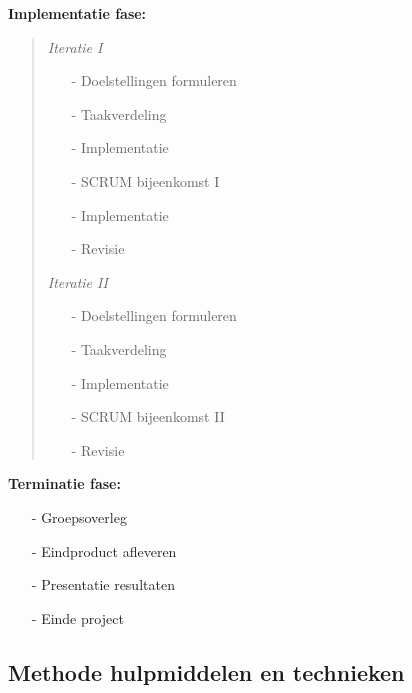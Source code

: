 \documentclass{article}
\begin{document}
\textbf{Implementatie fase:}
\begin{quotation}
	

\textit{Iteratie I}
\begin{itemize}
\item[-] Doelstellingen formuleren\\[-5mm]
\item[-] Taakverdeling\\[-5mm]
\item[-] Implementatie\\[-5mm]
\item[-] SCRUM bijeenkomst I\\[-5mm]
\item[-] Implementatie\\[-5mm]
\item[-] Revisie\\[-5mm]
\end{itemize}

\textit{Iteratie II}
\begin{itemize}
\item[-] Doelstellingen formuleren\\[-5mm]
\item[-] Taakverdeling\\[-5mm]
\item[-] Implementatie\\[-5mm]
\item[-] SCRUM bijeenkomst II\\[-5mm]
\item[-] Revisie\\[-5mm]
\end{itemize}

\end{quotation}

\textbf{Terminatie fase:}
\begin{itemize}
\item[-] Groepsoverleg\\[-5mm]
\item[-] Eindproduct afleveren\\[-5mm]
\item[-] Presentatie resultaten\\[-5mm]
\item[-] Einde project\\[-5mm]
\end{itemize}


\subsection{Methode hulpmiddelen en technieken}
\end{document}
